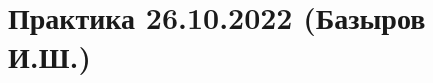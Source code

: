 \documentclass[main.tex]{subfiles}
\begin{document}

\section{Практика 26.10.2022 (Базыров И.Ш.)}
\end{document}
